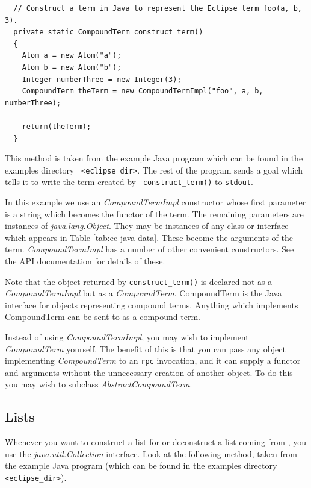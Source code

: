\begin{verbatim}
  // Construct a term in Java to represent the Eclipse term foo(a, b, 3).
  private static CompoundTerm construct_term()
  {
    Atom a = new Atom("a");
    Atom b = new Atom("b");
    Integer numberThree = new Integer(3);
    CompoundTerm theTerm = new CompoundTermImpl("foo", a, b, numberThree);

    return(theTerm);
  }
\end{verbatim}
This method is taken from the example Java program 
which can be found in the examples directory {\tt
<eclipse\_dir>}\exampleslocation. The rest of the program sends
{\eclipse} a goal which tells it to write the term created by {\tt
construct\_term()} to {\tt stdout}.

In this example we use an {\it CompoundTermImpl} constructor whose
first parameter is a string which becomes the functor of the term. The
remaining parameters are instances of {\it java.lang.Object}. They may
be instances of any class or interface which appears in Table
\ref{tab:ec-java-data}. These become the arguments of the term. {\it
CompoundTermImpl} has a number of other convenient constructors. See
the API documentation for details of these.

Note that the object returned by {\tt construct\_term()} is declared
not as a {\it CompoundTermImpl} but as a {\it
CompoundTerm}. CompoundTerm is the Java interface for objects
representing compound terms. Anything which implements CompoundTerm
can be sent to {\eclipse} as a compound term.

Instead of using {\it CompoundTermImpl}, you may wish to implement
{\it CompoundTerm} yourself. The benefit of this is that you can pass
any object implementing {\it CompoundTerm} to an {\tt rpc} invocation, and
it can supply a functor and arguments without the unnecessary creation
of another object. To do this you may wish to subclass {\it
AbstractCompoundTerm}.

\subsection{Lists}

Whenever you want to construct a list for {\eclipse} or deconstruct a
list coming from {\eclipse}, you use the {\it java.util.Collection}
interface. Look at the following method, taken from the example Java
program  (which can be found in the examples
directory {\tt <eclipse\_dir>}\exampleslocation).

